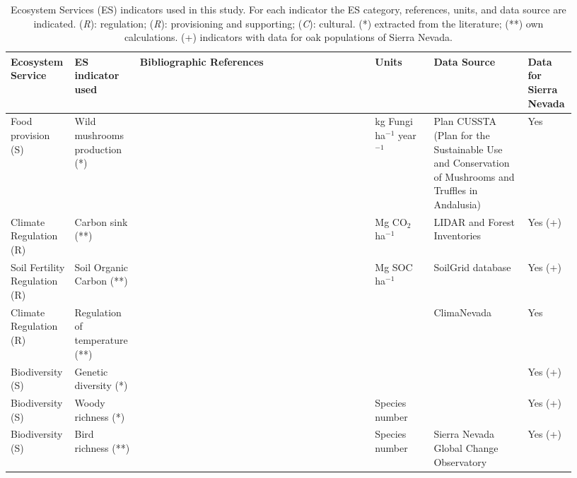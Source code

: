 \begin{table} 
\caption{Ecosystem Services (ES) indicators used in this study. For each indicator the ES category, references, units, and data source are indicated. (\emph{R}): regulation; (\emph{R}): provisioning and supporting; (\emph{C}): cultural. (*) extracted from the literature; (**) own calculations. (+) indicators with data for oak populations of Sierra Nevada.}\label{tab:es:data}
\centering
\scriptsize
\begin{adjustbox}{width=\linewidth}
\begin{threeparttable}
\begin{tabular}{>{\raggedleft}m{0.087\linewidth}m{0.108\linewidth}m{0.4\linewidth}m{0.102\linewidth}m{0.165\linewidth}m{0.071\linewidth}}
\textbf{Ecosystem Service} & \textbf{ES indicator used} & \textbf{Bibliographic References} & \textbf{Units} & \textbf{Data Source} & \textbf{Data for Sierra Nevada } \\ \toprule 
Food provision (S) & Wild mushrooms production (*) & \autocite{RayaLopezetal2017MuestreosPara} & kg Fungi ha$^{-1}$ year$^{-1}$ & Plan CUSSTA (Plan for the Sustainable Use and Conservation of Mushrooms and Truffles in Andalusia) & Yes \\
Climate Regulation (R) & Carbon sink (**) & \autocite{PerezLuqueetal2021CarbonSequestration} & Mg CO$_2$ ha$^{-1}$ & LIDAR and Forest Inventories & Yes (+) \\
Soil Fertility Regulation (R) & Soil Organic Carbon (**) & \autocite{Hengletal2017SoilGrids250mGlobal, Batjesetal2017WoSISProviding, Batjesetal2020StandardisedSoil} & Mg SOC ha$^{-1}$ & SoilGrid database & Yes (+) \\
Climate Regulation (R) & Regulation of temperature (**) & \autocite{Zamoraetal2021UniendoMacro} &  & ClimaNevada & Yes \\
Biodiversity (S) & Genetic diversity (*) & \autocites{ValbuenaCarabanaGil2013GeneticResilience,ValbuenaCarabanaGil2013ReduceAprovechamiento,ValbuenaCarabanaGil2014EfectosGestion,ValbuenaCarabanaGil2017CentenaryCoppicing} &  &  & Yes (+) \\
Biodiversity (S) & Woody richness (*) & \autocite{PerezLuqueetal2014SinfonevadaDataset,Loriteetal2008PhytosociologicalReview} & Species number &  & Yes (+) \\
Biodiversity (S) & Bird richness (**) & \autocites{BareaAzconetal2012PasseriformesOtras,PerezLuqueetal2016DatasetPasserine,ZamoraBareaAzcon2015LongTermChanges,PerezLuqueetal2021ManualGestion} & Species number & Sierra Nevada Global Change Observatory & Yes (+) \\

\end{tabular}
\end{threeparttable}
\end{adjustbox}
\end{table}
